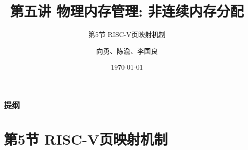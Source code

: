 


\title[第5讲]{第五讲 物理内存管理: 非连续内存分配} %
\subtitle{第5节 RISC-V页映射机制}
\author{向勇、陈渝、李国良} %
\date{\today} %



\begin{frame}
\titlepage %
\end{frame}

\begin{frame}
\frametitle{提纲} %
\tableofcontents %
\end{frame}

\section{第5节 RISC-V页映射机制}%
